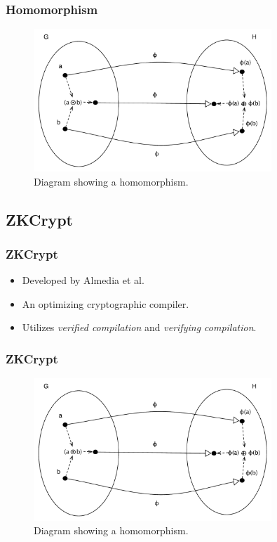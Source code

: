 \documentclass{beamer}
\begin{document}
\begin{frame}
	\frametitle{Homomorphism}
	
	\begin{figure}
	\centering
	\includegraphics[width=0.80\textwidth]{homomorphism.pdf}
	\caption{Diagram showing a homomorphism.}
	\label{fig:HCycle}
	\end{figure}
\end{frame}

\subsection{ZKCrypt}

\begin{frame}
	\frametitle{ZKCrypt}
	\begin{itemize}
		\item Developed by Almedia et al.
		\item An optimizing cryptographic compiler.
		\item Utilizes \textit{verified compilation} and \textit{verifying compilation}.
	\end{itemize}
\end{frame}

\begin{frame}
	\frametitle{ZKCrypt}
	
	\begin{figure}
	\centering
	\includegraphics[width=0.80\textwidth]{homomorphism.pdf}
	\caption{Diagram showing a homomorphism.}
	\label{fig:HCycle}
	\end{figure}
\end{frame}
\end{document}
